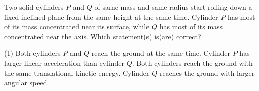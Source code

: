 
\item Two solid cylinders \(P\) and \(Q\) of same mass and same radius start rolling down a fixed inclined plane from the same height at the same time. Cylinder \(P\) has most of its mass concentrated near its surface, while \(Q\) has most of its mass concentrated near the axis. Which statement(s) is(are) correct?
    \begin{tasks}(1)
        \task Both cylinders \(P\) and \(Q\) reach the ground at the same time.
        \task Cylinder \(P\) has larger linear acceleration than cylinder \(Q\).
        \task Both cylinders reach the ground with the same translational kinetic energy.
        \task Cylinder \(Q\) reaches the ground with larger angular speed.
    \end{tasks}
